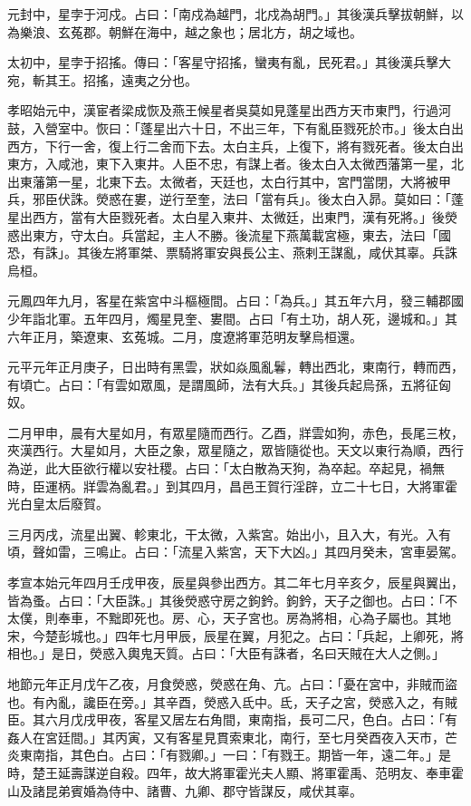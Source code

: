 \begin{pinyinscope}
元封中，星孛于河戍。占曰：「南戍為越門，北戍為胡門。」其後漢兵擊拔朝鮮，以為樂浪、玄菟郡。朝鮮在海中，越之象也；居北方，胡之域也。

太初中，星孛于招搖。傳曰：「客星守招搖，蠻夷有亂，民死君。」其後漢兵擊大宛，斬其王。招搖，遠夷之分也。

孝昭始元中，漢宦者梁成恢及燕王候星者吳莫如見蓬星出西方天市東門，行過河鼓，入營室中。恢曰：「蓬星出六十日，不出三年，下有亂臣戮死於市。」後太白出西方，下行一舍，復上行二舍而下去。太白主兵，上復下，將有戮死者。後太白出東方，入咸池，東下入東井。人臣不忠，有謀上者。後太白入太微西藩第一星，北出東藩第一星，北東下去。太微者，天廷也，太白行其中，宮門當閉，大將被甲兵，邪臣伏誅。熒惑在婁，逆行至奎，法曰「當有兵」。後太白入昴。莫如曰：「蓬星出西方，當有大臣戮死者。太白星入東井、太微廷，出東門，漢有死將。」後熒惑出東方，守太白。兵當起，主人不勝。後流星下燕萬載宮極，東去，法曰「國恐，有誅」。其後左將軍桀、票騎將軍安與長公主、燕剌王謀亂，咸伏其辜。兵誅烏桓。

元鳳四年九月，客星在紫宮中斗樞極間。占曰：「為兵。」其五年六月，發三輔郡國少年詣北軍。五年四月，燭星見奎、婁間。占曰「有土功，胡人死，邊城和。」其六年正月，築遼東、玄菟城。二月，度遼將軍范明友擊烏桓還。

元平元年正月庚子，日出時有黑雲，狀如焱風亂鬊，轉出西北，東南行，轉而西，有頃亡。占曰：「有雲如眾風，是謂風師，法有大兵。」其後兵起烏孫，五將征匈奴。

二月甲申，晨有大星如月，有眾星隨而西行。乙酉，牂雲如狗，赤色，長尾三枚，夾漢西行。大星如月，大臣之象，眾星隨之，眾皆隨從也。天文以東行為順，西行為逆，此大臣欲行權以安社稷。占曰：「太白散為天狗，為卒起。卒起見，禍無時，臣運柄。牂雲為亂君。」到其四月，昌邑王賀行淫辟，立二十七日，大將軍霍光白皇太后廢賀。

三月丙戌，流星出翼、軫東北，干太微，入紫宮。始出小，且入大，有光。入有頃，聲如雷，三鳴止。占曰：「流星入紫宮，天下大凶。」其四月癸未，宮車晏駕。

孝宣本始元年四月壬戌甲夜，辰星與參出西方。其二年七月辛亥夕，辰星與翼出，皆為蚤。占曰：「大臣誅。」其後熒惑守房之鉤鈐。鉤鈐，天子之御也。占曰：「不太僕，則奉車，不黜即死也。房、心，天子宮也。房為將相，心為子屬也。其地宋，今楚彭城也。」四年七月甲辰，辰星在翼，月犯之。占曰：「兵起，上卿死，將相也。」是日，熒惑入輿鬼天質。占曰：「大臣有誅者，名曰天賊在大人之側。」

地節元年正月戊午乙夜，月食熒惑，熒惑在角、亢。占曰：「憂在宮中，非賊而盜也。有內亂，讒臣在旁。」其辛酉，熒惑入氐中。氐，天子之宮，熒惑入之，有賊臣。其六月戊戌甲夜，客星又居左右角間，東南指，長可二尺，色白。占曰：「有姦人在宮廷間。」其丙寅，又有客星見貫索東北，南行，至七月癸酉夜入天市，芒炎東南指，其色白。占曰：「有戮卿。」一曰：「有戮王。期皆一年，遠二年。」是時，楚王延壽謀逆自殺。四年，故大將軍霍光夫人顯、將軍霍禹、范明友、奉車霍山及諸昆弟賓婚為侍中、諸曹、九卿、郡守皆謀反，咸伏其辜。


\end{pinyinscope}
